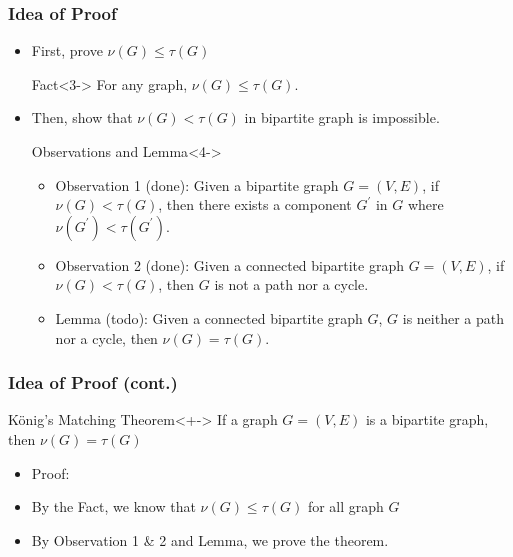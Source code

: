 \documentclass{beamer}
\begin{document}
\begin{frame}
  \frametitle{Idea of Proof}
  \begin{itemize}
  \item<1-> First, prove $\nu{(G)}\leq{\tau{(G)}}$
    \begin{block}{Fact}<3->
    For any graph, $\nu{(G)}\leq{\tau{(G)}}$.
    \end{block}
  \item<2-> Then, show that $\nu{(G)}<\tau{(G)}$ in bipartite graph is impossible.
    \begin{exampleblock}{Observations and Lemma}<4->
    \begin{itemize}
    \item Observation 1 (done): Given a bipartite graph $G=(V,E)$, if $\nu{(G)}<\tau{(G)}$, then there exists a component $G^{'}$ in $G$ where $\nu{(G^{'})}<\tau{(G^{'})}$.
    \item<5-> Observation 2 (done): Given a connected bipartite graph $G=(V,E)$, if $\nu{(G)}<\tau{(G)}$, then $G$ is not a path nor a cycle.
    \item<6-> Lemma (\alert{todo}): Given a connected bipartite graph $G$, $G$ is neither a path nor a cycle, then $\nu{(G)}=\tau{(G)}$.
    \end{itemize}
    \end{exampleblock}
  \end{itemize}
\end{frame}

\begin{frame}
  \frametitle{Idea of Proof (cont.)}
  \begin{exampleblock}{K\"{o}nig's Matching Theorem}<+->
    If a graph $G=(V,E)$ is a bipartite graph, then $\nu{(G)}=\tau{(G)}$
  \end{exampleblock}
  \begin{itemize}[<+->]
  \item Proof:
  \item By the Fact, we know that $\nu{(G)}\leq{\tau{(G)}}$ for all graph $G$
  \item By Observation 1 \& 2 and Lemma, we prove the theorem.
  \end{itemize}
\end{frame}
\end{document}
